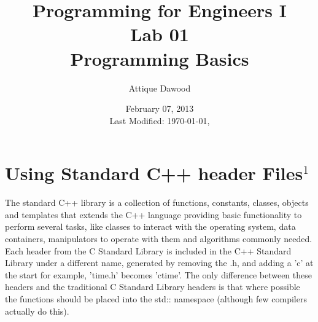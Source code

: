 \documentclass[12pt,a4paper]{article}
\title{\vspace{-1cm}Programming for Engineers I\\Lab 01\\Programming Basics}
\author{Attique Dawood}
\date{February 07, 2013\\[0.2cm] Last Modified: \today, \currenttime}
\begin{document}
\maketitle
\section{Using Standard C++ header Files$^1$}
The standard C++ library is a collection of functions, constants, classes, objects and templates that extends the C++ language providing basic functionality to perform several tasks, like classes to interact with the operating system, data containers, manipulators to operate with them and algorithms commonly needed.\\
Each header from the C Standard Library is included in the C++ Standard Library under a different name, generated by removing the .h, and adding a 'c' at the start for example, 'time.h' becomes 'ctime'. The only difference between these headers and the traditional C Standard Library headers is that where possible the functions should be placed into the std:: namespace (although few compilers actually do this).\\
\end{document}
